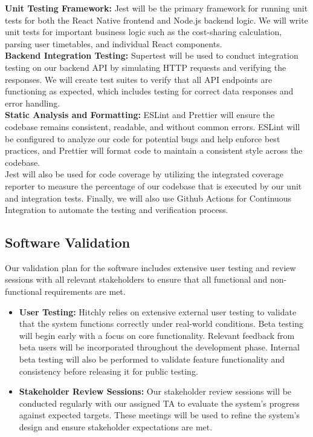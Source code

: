 \documentclass[12pt, titlepage]{article}
\begin{document}
\noindent \textbf{Unit Testing Framework:} Jest will be the primary framework for running unit tests for both the React Native frontend and Node.js backend logic. We will write unit tests for important business logic such as the cost-sharing calculation, parsing user timetables, and individual React components. \\
 
\noindent \textbf{Backend Integration Testing:} Supertest will be used to conduct integration testing on our backend API by simulating HTTP requests and verifying the responses. We will create test suites to verify that all API endpoints are functioning as expected, which includes testing for correct data responses and error handling. \\

\noindent \textbf{Static Analysis and Formatting:} ESLint and Prettier will ensure the codebase remains consistent, readable, and without common errors. ESLint will be configured to analyze our code for potential bugs and help enforce best practices, and Prettier will format code to maintain a consistent style across the codebase. \\

\noindent Jest will also be used for code coverage by utilizing the integrated coverage reporter to measure the percentage of our codebase that is executed by our unit and integration tests. Finally, we will also use Github Actions for Continuous Integration to automate the testing and verification process. \\

\subsection{Software Validation}

Our validation plan for the software includes extensive user testing and review sessions with all relevant stakeholders to ensure that all functional and non-functional requirements are met.

\begin{itemize}
    \item \textbf{User Testing:} 
    Hitchly relies on extensive external user testing to validate that the system functions correctly under real-world conditions. 
    Beta testing will begin early with a focus on core functionality. 
    Relevant feedback from beta users will be incorporated throughout the development phase. 
    Internal beta testing will also be performed to validate feature functionality and consistency before releasing it for public testing.

    \item \textbf{Stakeholder Review Sessions:} 
    Our stakeholder review sessions will be conducted regularly with our assigned TA to evaluate the system's progress against expected targets. 
    These meetings will be used to refine the system’s design and ensure stakeholder expectations are met.
\end{itemize}
\end{document}
